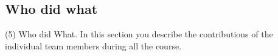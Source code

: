 \documentclass[10pt, a4paper]{article}
\begin{document}
\begin{multicols}{2}



	    \section{Who did what}
	    (5) Who did What. In this section you describe the contributions of the individual team members during all the course.


	
	
	\end{multicols}
	
\end{document}
